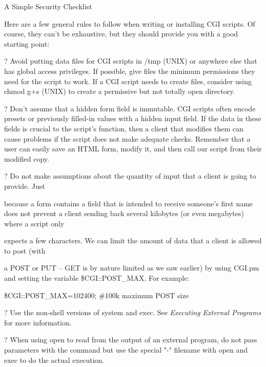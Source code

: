 \documentclass[a4paper,11pt]{book}
\begin{document}
\noindent 

\noindent A Simple Security Checklist

\noindent 

\noindent Here are a few general rules to follow when writing or installing CGI scripts. Of course, they can't be exhaustive, but they should provide you with a good starting point:

\noindent 

\noindent ? Avoid putting data files for CGI scripts in /tmp (UNIX) or anywhere else that has global access privileges. If possible, give files the minimum permissions they need for the script to work. If a CGI script needs to create files, consider using chmod g+s (UNIX) to create a permissive but not totally open directory.

\noindent 

\noindent ? Don't assume that a hidden form field is immutable. CGI scripts often encode presets or previously filled-in values with a hidden input field. If the data in these fields is crucial to the script's function, then a client that modifies them can cause problems if the script does not make adequate checks. Remember that a user can easily save an HTML form, modify it, and then call our script from their modified copy.

\noindent 

\noindent 

\noindent ? Do not make assumptions about the quantity of input that a client is going to provide. Just

\noindent because a form contains a field that is intended to receive someone's first name does not prevent a client sending back several kilobytes (or even megabytes) where a script only

\noindent expects a few characters. We can limit the amount of data that a client is allowed to post (with

\noindent a POST or PUT -- GET is by nature limited as we saw earlier) by using CGI.pm and setting the variable \$CGI::POST\_MAX. For example:

\noindent 

\noindent \$CGI::POST\_MAX=102400; \#100k maximum POST size

\noindent 

\noindent ? Use the non-shell versions of system and exec. See \textit{Executing External Programs }for more information.

\noindent 

\noindent ? When using open to read from the output of an external program, do not pass parameters with the command but use the special "\textbar -" filename with open and exec to do the actual execution.
\end{document}
